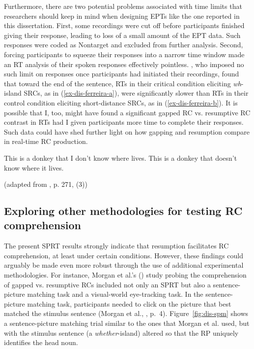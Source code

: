 Furthermore, there are two potential problems associated with time limits that researchers should keep in mind when designing EPTs like the one reported in this dissertation. First, some recordings were cut off before participants finished giving their response, leading to loss of a small amount of the EPT data. Such responses were coded as Nontarget and excluded from further analysis. Second, forcing participants to squeeze their responses into a narrow time window made an RT analysis of their spoken responses effectively pointless. \textcite{ferreira.swets2005}, who imposed no such limit on responses once participants had initiated their recordings, found that toward the end of the sentence, RTs in their critical condition eliciting \textit{wh}-island SRCs, as in (\ref{ex-dis-ferreira-a}), were significantly slower than RTs in their control condition eliciting short-distance SRCs, as in (\ref{ex-dis-ferreira-b}). It is possible that I, too, might have found a significant gapped RC vs. resumptive RC contrast in RTs had I given participants more time to complete their responses. Such data could have shed further light on how gapping and resumption compare in real-time RC production.

\pex
\a \ljudge*This is a donkey that I don't know where  lives.\label{ex-dis-ferreira-a}
\a This is a donkey that \boxing{\_\_} doesn't know where it lives.\label{ex-dis-ferreira-b}
\par\nobreak\vspace{5pt}
\hfill (adapted from \cite{ferreira.swets2005}, p. 271, (3))
\xe 

\subsection{Exploring other methodologies for testing RC comprehension}\label{dis-limitation-spr}

The present SPRT results strongly indicate that resumption facilitates RC comprehension, at least under certain conditions. However, these findings could arguably be made even more robust through the use of additional experimental methodologies. For instance, Morgan et al.'s (\citeyear{morgan.etal2020}) study probing the comprehension of gapped vs. resumptive RCs included not only an SPRT but also a sentence-picture matching task and a visual-world eye-tracking task. In the sentence-picture matching task, participants needed to click on the picture that best matched the stimulus sentence (Morgan et al., \citeyear{morgan.etal2020}, p.~4). Figure~\ref{fig:dis-spm} shows a sentence-picture matching trial similar to the ones that Morgan et al. used, but with the stimulus sentence (a \textit{whether}-island) altered so that the RP uniquely identifies the head noun.

